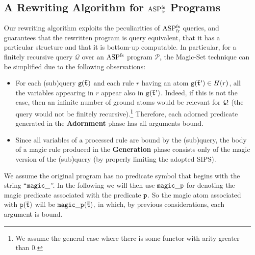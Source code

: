 \documentclass{tlp}
\newcommand{\p}{\ensuremath{{\mathcal{P}}}}
\newcommand{\R}{\ensuremath{r}}
\newcommand{\HR}{\ensuremath{H(\R)}}
\newcommand{\q}{\ensuremath{{\cal Q}}}
\newcommand{\Q}{\mathcal{Q}}
\renewcommand{\t}{\bar t}
\newcommand{\ASPFN}{\ensuremath{\rm ASP^{\rm fs}}}
\newcommand{\ASPFNFR}{\ensuremath{\rm ASP^{\rm fs}_{\rm fr}}}
\begin{document}
\subsection{A Rewriting Algorithm for \ASPFNFR{} Programs}
\label{sec:finirec-magic}

Our rewriting algorithm exploits the peculiarities of 
\ASPFNFR{} queries, and guarantees that the rewritten program is query
equivalent, that it has a particular structure and that it is bottom-up
computable.
In particular, for a finitely recursive query $\Q$ over an \ASPFN{} program
$\p$, the Magic-Set technique can be simplified due to the following observations:


\begin{itemize}
 \item 
\vspace{-0.2cm}
  For each (sub)query $\tt g(\t)$ and each rule $\R$ having an atom ${\tt g(\t')} \in \HR$,
  all the variables appearing in $\R$ appear also in $\tt g(\t')$.
  Indeed, if this is not the case, then an infinite number of ground atoms 
  would be relevant for $\q$ (the query would not be finitely recursive).\footnote{We assume the general case where there is some functor with arity
greater than 0.}
  Therefore, each adorned predicate generated in the \textbf{Adornment} phase
  has all arguments bound.
  
 \item
  Since all variables of a processed rule are bound by the (sub)query,
  the body of a magic rule produced in the \textbf{Generation} phase
  consists only of the magic version of the
  (sub)query (by properly limiting the adopted SIPS).
\vspace{-0.2cm}
\end{itemize}

\noindent
We assume the original program has no predicate symbol that 
begins with the string ``$\tt magic\_$''. In the following we will then use
$\tt magic\_p$ for denoting the magic predicate associated with the
predicate $\tt p$. So the magic atom associated with $\tt p(\t)$ 
will be $\tt magic\_p(\t)$, in which, by previous considerations, each argument is bound.
\end{document}

